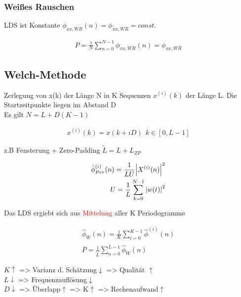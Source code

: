 \documentclass[10pt,a4paper]{article}
\begin{document}
\subsubsection{Weißes Rauschen}
LDS ist Konstante $\phi_{xx,WR}(n) = \phi_{xx,WR} = const.$
  \begin{mdframed}[style=exercise]
    \begin{align}
        P = \frac{1}{N} \sum_{n=0}^{N-1} \phi_{xx,WR}(n) = \phi_{xx,WR}
    \end{align}
  \end{mdframed}
\subsection{Welch-Methode}
Zerlegung von x(k) der Länge N in K Sequenzen $x^{(i)}(k)$ der Länge L. 
Die Startzeitpunkte liegen im Abstand D \\
Es gilt $N=L+D(K-1)$
  \begin{mdframed}[style=exercise]
    \begin{align}
        x^{(i)}(k) = x(k+iD) \ \ k\in[0,L-1] 
    \end{align}
  \end{mdframed}
z.B Fensterung + Zero-Padding $\tilde{L} = L + L_{ZP}$
  \begin{mdframed}[style=exercise]
    \begin{align}
        \hat{\phi}_{Per}^{(i)}(n) = \frac{1}{LU}\abs{X^{(i)}(n)}^2\\
        U = \frac{1}{L}\sum_{k=0}^{N-1} \abs{w(t)}^2 
    \end{align}
  \end{mdframed}
Das LDS ergiebt sich aus \textcolor{red}{Mittelung} aller K Periodogramme
  \begin{mdframed}[style=exercise]
    \begin{align}
        \hat{\phi}_{W}(n) = \frac{1}{K}\sum_{i=0}^{K-1} \hat{\phi}^{(i)}(n) \\
        P = \frac{1}{\tilde{L}}\sum_{n=0}^{\tilde{L}-1}\hat{\phi}_{W}(n)
    \end{align}
  \end{mdframed}
$K\uparrow$ => Varianz d. Schätzung$\downarrow$ => Qualität $\uparrow$\\
$L\downarrow$ => Frequenzauflösung$\downarrow$ \\
$D\downarrow$ => Überlapp$\uparrow$ => K$\uparrow$ => Rechenaufwand$\uparrow$
\end{document}
